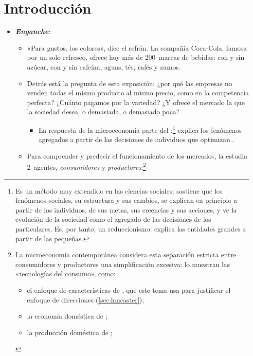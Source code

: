 \documentclass[11pt]{article}
\begin{document}
\tceetitulo

\section*{Introducción}

\begin{itemize}
\item \textbf{\emph{Enganche}}:
  \begin{itemize}
  \item «Para gustos, los colores», dice el refrán. La compañía Coca-Cola, famosa por un solo refresco, ofrece hoy más de 200~marcas de bebidas\nocite{CocaCola2026Brands}: con y sin azúcar, con y sin cafeína, aguas, tés, cafés y zumos.
  \item Detrás está la pregunta de esta exposición: ¿por qué las empresas no venden todas el mismo producto al mismo precio, como en la competencia perfecta? ¿Cuánto pagamos por la variedad? ¿Y ofrece el mercado la que la sociedad desea, o demasiada, o demasiado poca?
    \begin{itemize}
    \item La respuesta de la microeconomía parte del :\footnote{Es un método muy extendido en las ciencias sociales: sostiene que los fenómenos sociales, su estructura y sus cambios, se explican en principio a partir de los individuos, de sus metas, sus creencias y sus acciones, y ve la evolución de la sociedad como el agregado de las decisiones de los particulares. Es, por tanto, un reduccionismo: explica las entidades grandes a partir de las pequeñas.} explica los fenómenos agregados a partir de las decisiones de individuos que optimizan .
    \end{itemize}
  \item Para comprender y predecir el funcionamiento de los mercados, la  estudia 2~agentes, \emph{consumidores} y \emph{productores}:\footnote{La microeconomía contemporánea considera esta separación estricta entre consumidores y productores una simplificación excesiva\nocite{EkelundHebert2013History}: lo muestran las «tecnologías del consumo», como:
\begin{itemize}
\item el enfoque de características de , que este tema usa para justificar el enfoque de direcciones (\ref{sec:lancaster});
\item la economía doméstica de ;
\item la producción doméstica de ;

\end{itemize}}
\end{itemize}
\end{itemize}
\end{document}
